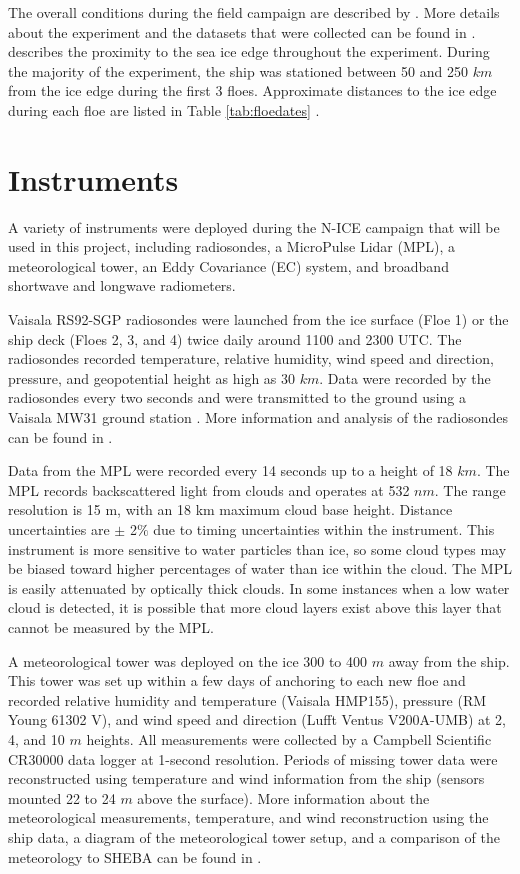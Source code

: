  The overall conditions during the field campaign are described by \citet{cohen:2017, kayser:2017, walden:2017}. More details about the experiment and the datasets that were collected can be found in \citet{granskog:2015}. \citet{itkin:2017} describes the proximity to the sea ice edge throughout the experiment. During the majority of the experiment, the ship was stationed between 50 and 250 $km$ from the ice edge during the first 3 floes. Approximate distances to the ice edge during each floe are listed in Table \ref{tab:floedates} \citep{oikkonen:2017}.

\section{Instruments}
A variety of instruments were deployed during the N-ICE campaign that will be used in this project, including radiosondes, a MicroPulse Lidar (MPL), a meteorological tower, an Eddy Covariance (EC) system, and broadband shortwave and longwave radiometers. 

Vaisala RS92-SGP radiosondes were launched from the ice surface (Floe 1) or the ship deck (Floes 2, 3, and 4) twice daily around 1100 and 2300 UTC. The radiosondes recorded temperature, relative humidity, wind speed and direction, pressure, and geopotential height as high as 30 $km$. Data were recorded by the radiosondes every two seconds and were transmitted to the ground using a Vaisala MW31 ground station \citep{kayser:2017, cohen:2017}. More information and analysis of the radiosondes can be found in \citet{kayser:2017}.

Data from the MPL were recorded every 14 seconds up to a height of 18 $km$. The MPL records backscattered light from clouds and operates at 532 $nm$. The range resolution is 15 m, with an 18 km maximum cloud base height. Distance uncertainties are $\pm$ 2$\%$ due to timing uncertainties within the instrument. This instrument is more sensitive to water particles than ice, so some cloud types may be biased toward higher percentages of water than ice within the cloud. The MPL is easily attenuated by optically thick clouds. In some instances when a low water cloud is detected, it is possible that more cloud layers exist above this layer that cannot be measured by the MPL. 

A meteorological tower was deployed on the ice 300 to 400 $m$ away from the ship. This tower was set up within a few days of anchoring to each new floe and recorded relative humidity and temperature (Vaisala HMP155), pressure (RM Young 61302 V), and wind speed and direction (Lufft Ventus V200A-UMB) at 2, 4, and 10 $m$ heights. All measurements were collected by a Campbell Scientific CR30000 data logger at 1-second resolution. Periods of missing tower data were reconstructed using temperature and wind information from the ship (sensors mounted 22 to 24 $m$ above the surface). More information about the meteorological measurements, temperature, and wind reconstruction using the ship data, a diagram of the meteorological tower setup, and a comparison of the meteorology to SHEBA can be found in \citet{cohen:2017}.

